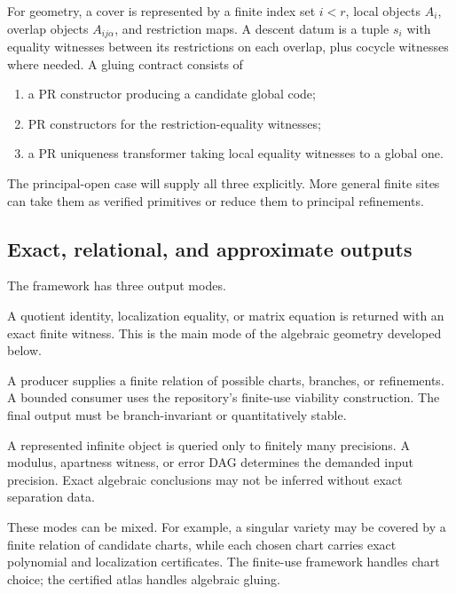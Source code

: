 For geometry, a cover is represented by a finite index set $i<r$, local objects $A_i$, overlap
objects $A_{ij\alpha}$, and restriction maps.  A descent datum is a tuple $s_i$ with equality
witnesses between its restrictions on each overlap, plus cocycle witnesses where needed.  A gluing
contract consists of
\begin{enumerate}[label=(\alph*)]
\item a PR constructor producing a candidate global code;
\item PR constructors for the restriction-equality witnesses;
\item a PR uniqueness transformer taking local equality witnesses to a global one.
\end{enumerate}

The principal-open case will supply all three explicitly.  More general finite sites can take them
as verified primitives or reduce them to principal refinements.

\subsection{Exact, relational, and approximate outputs}

The framework has three output modes.

\begin{description}[style=nextline]
\item[Exact certificate mode.]
A quotient identity, localization equality, or matrix equation is returned with an exact finite
witness.  This is the main mode of the algebraic geometry developed below.

\item[Relational finite-use mode.]
A producer supplies a finite relation of possible charts, branches, or refinements.  A bounded
consumer uses the repository's finite-use viability construction.  The final output must be
branch-invariant or quantitatively stable.

\item[Approximation mode.]
A represented infinite object is queried only to finitely many precisions.  A modulus, apartness
witness, or error DAG determines the demanded input precision.  Exact algebraic conclusions may not
be inferred without exact separation data.
\end{description}

These modes can be mixed.  For example, a singular variety may be covered by a finite relation of
candidate charts, while each chosen chart carries exact polynomial and localization certificates.
The finite-use framework handles chart choice; the certified atlas handles algebraic gluing.

